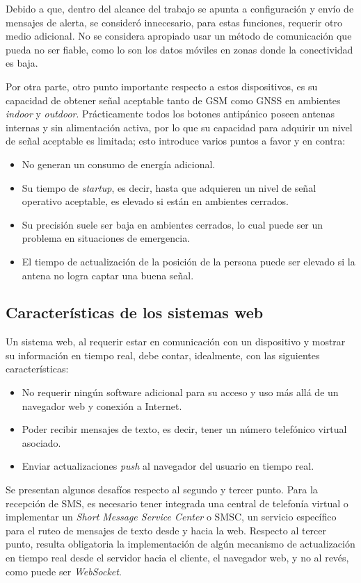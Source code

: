 Debido a que, dentro del alcance del trabajo se apunta a configuración y envío de mensajes de alerta, se consideró innecesario, para estas funciones, requerir otro medio adicional. No se considera apropiado usar un método de comunicación que pueda no ser fiable, como lo son los datos móviles en zonas donde la conectividad es baja.

Por otra parte, otro punto importante respecto a estos dispositivos, es su capacidad de obtener señal aceptable tanto de GSM como GNSS en ambientes \textit{indoor} y \textit{outdoor}. Prácticamente todos los botones antipánico poseen antenas internas y sin alimentación activa, por lo que su capacidad para adquirir un nivel de señal aceptable es limitada; esto introduce varios puntos a favor y en contra:
\begin{itemize}
	\item No generan un consumo de energía adicional.
	\item Su tiempo de \textit{startup}, es decir, hasta que adquieren un nivel de señal operativo aceptable, es elevado si están en ambientes cerrados.
	\item Su precisión suele ser baja en ambientes cerrados, lo cual puede ser un problema en situaciones de emergencia.
	\item El tiempo de actualización de la posición de la persona puede ser elevado si la antena no logra captar una buena señal.
\end{itemize}

\subsection{Características de los sistemas web}

Un sistema web, al requerir estar en comunicación con un dispositivo y mostrar su información en tiempo real, debe contar, idealmente, con las siguientes características:
\begin{itemize}
	\item No requerir ningún software adicional para su acceso y uso más allá de un navegador web y conexión a Internet.
	\item Poder recibir mensajes de texto, es decir, tener un número telefónico virtual asociado.
	\item Enviar actualizaciones \textit{push} al navegador del usuario en tiempo real.
\end{itemize}

Se presentan algunos desafíos respecto al segundo y tercer punto. Para la recepción de SMS, es necesario tener integrada una central de telefonía virtual o implementar un \textit{Short Message Service Center} o SMSC, un servicio específico para el ruteo de mensajes de texto desde y hacia la web. Respecto al tercer punto, resulta obligatoria la implementación de algún mecanismo de actualización en tiempo real desde el servidor hacia el cliente, el navegador web, y no al revés, como puede ser \textit{WebSocket}.

